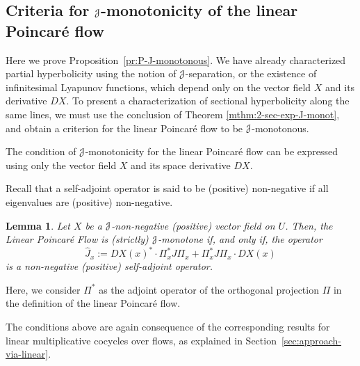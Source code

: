 \documentclass[12pt,reqno]{amsart}
\numberwithin{equation}{section}
\theoremstyle{plain}
\newtheorem{lemma}[theorem]{Lemma}
\theoremstyle{definition}
\newcommand{\J}{\EuScript{J}}
\begin{document}
\subsection{Criteria for $\J$-monotonicity of the linear
  Poincar\'e flow}
\label{sec:criter-j-monoton}

Here we prove Proposition~\ref{pr:P-J-monotonous}.  We have
already characterized partial hyperbolicity using the notion
of $\J$-separation, or the existence of infinitesimal
Lyapunov functions, which depend only on the vector field
$X$ and its derivative $DX$. To present a characterization
of sectional hyperbolicity along the same lines, we must use
the conclusion of Theorem \ref{mthm:2-sec-exp-J-monot}, and
obtain a criterion for the linear Poincar\'e flow to be
$\J$-monotonous.

The condition of $\J$-monotonicity for the linear Poincar\'e
flow can be expressed using only the vector field $X$ and
its space derivative $DX$.

Recall that a self-adjoint operator is said to be (positive)
non-negative if all eigenvalues are (positive) non-negative.

\begin{lemma}
  \label{le:P-J-monotonous}
  Let $X$ be a $\J$-non-negative (positive) vector field on
  $U$.  Then, the Linear Poincar\'e Flow is (strictly)
  $\J$-monotone if, and only if, the operator
  $$
  \hat J_x:= DX(x)^*\cdot \Pi_x^* J \Pi_x + \Pi_x^* J \Pi_x\cdot DX(x)
  $$
  is a non-negative (positive) self-adjoint operator.
\end{lemma}
Here, we consider $\Pi^*$ as the adjoint operator of the
orthogonal projection $\Pi$ in the definition of the linear
Poincar\'e flow.

The conditions above are again consequence of the corresponding
results for linear multiplicative cocycles over flows, as
explained in Section~\ref{sec:approach-via-linear}.
\end{document}
